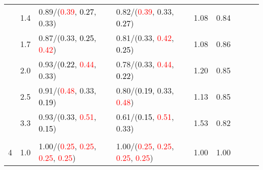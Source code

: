 \documentclass[10pt,a4paper]{report}
\begin{document}
\begin{table}[!htbp]
\begin{center}
{\begin{tabular}{ccllccccc}
				  & 1.4                               & 0.89/(\textcolor{red}{0.39}, \textcolor{black}{0.27}, 0.33)                                                                                     & 0.82/(\textcolor{red}{0.39}, 0.33, \textcolor{black}{0.27})                                                                                     & 1.08             & 0.84                     \\
				  & 1.7                               & 0.87/(0.33, \textcolor{black}{0.25}, \textcolor{red}{0.42})                                                                                     & 0.81/(0.33, \textcolor{red}{0.42}, \textcolor{black}{0.25})                                                                                     & 1.08             & 0.86                     \\
				  & 2.0                               & 0.93/(\textcolor{black}{0.22}, \textcolor{red}{0.44}, 0.33)                                                                                     & 0.78/(0.33, \textcolor{red}{0.44}, \textcolor{black}{0.22})                                                                                     & 1.20             & 0.85                     \\
				  & 2.5                               & 0.91/(\textcolor{red}{0.48}, 0.33, \textcolor{black}{0.19})                                                                                     & 0.80/(\textcolor{black}{0.19}, 0.33, \textcolor{red}{0.48})                                                                                     & 1.13             & 0.85                     \\
				  & 3.3                               & 0.93/(0.33, \textcolor{red}{0.51}, \textcolor{black}{0.15})                                                                                     & 0.61/(\textcolor{black}{0.15}, \textcolor{red}{0.51}, 0.33)                                                                                     & 1.53             & 0.82                     \\
				  &                                   &                                                                                                                                                 &                                                                                                                                                 &                                             \\
				4 & 1.0                               & 1.00/(\textcolor{red}{0.25}, \textcolor{red}{0.25}, \textcolor{red}{0.25}, \textcolor{red}{0.25})                                               & 1.00/(\textcolor{red}{0.25}, \textcolor{red}{0.25}, \textcolor{red}{0.25}, \textcolor{red}{0.25})                                               & 1.00             & 1.00                     \\

\end{tabular}}
\end{center}
\end{table}
\end{document}

